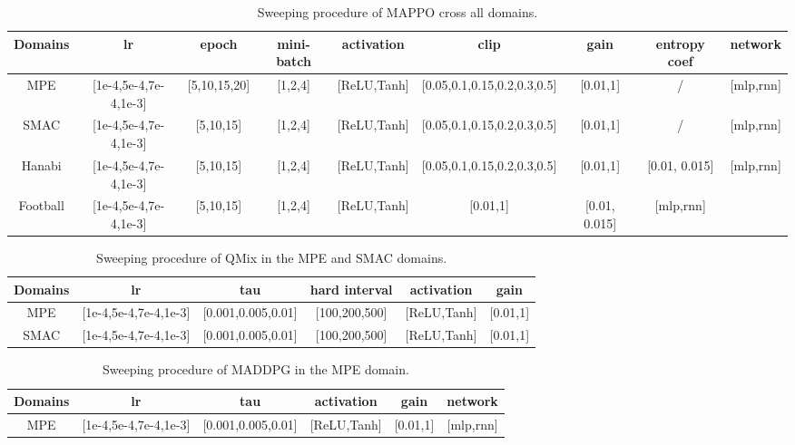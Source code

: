  

\begin{table}[]
\centering
\begin{adjustwidth}{-.98in}{-.5in}
\begin{tabular}{ccccccccc}
\toprule
Domains & lr                        & epoch        & mini-batch & activation      & clip & gain         & entropy coef & network     \\ \midrule
MPE     & {[}1e-4,5e-4,7e-4,1e-3{]} & {[}5,10,15,20{]} & {[}1,2,4{]}       & {[}ReLU,Tanh{]} & {[}0.05,0.1,0.15,0.2,0.3,0.5{]} & {[}0.01,1{]} & /  & {[}mlp,rnn{]}               \\ 
SMAC    & {[}1e-4,5e-4,7e-4,1e-3{]} & {[}5,10,15{]}    & {[}1,2,4{]}       & {[}ReLU,Tanh{]} & {[}0.05,0.1,0.15,0.2,0.3,0.5{]} & {[}0.01,1{]} & /   & {[}mlp,rnn{]}               \\
Hanabi  & {[}1e-4,5e-4,7e-4,1e-3{]} & {[}5,10,15{]}    & {[}1,2,4{]}       & {[}ReLU,Tanh{]} &{[}0.05,0.1,0.15,0.2,0.3,0.5{]}& {[}0.01,1{]} & {[}0.01, 0.015{]} & {[}mlp,rnn{]} \\
Football  & {[}1e-4,5e-4,7e-4,1e-3{]} & {[}5,10,15{]}    & {[}1,2,4{]}       & {[}ReLU,Tanh{]} & {[}0.01,1{]} & {[}0.01, 0.015{]} & {[}mlp,rnn{]} \\
\bottomrule
\end{tabular}
\end{adjustwidth}
\caption{Sweeping procedure of MAPPO cross all domains.}
\label{tab:MAPPO-tune-hyper}
\end{table}


\begin{table}[]
\centering
\begin{tabular}{cccccc}
\toprule
Domains & lr                        & tau                   & hard interval & activation      & gain         \\\midrule
MPE     & {[}1e-4,5e-4,7e-4,1e-3{]} & {[}0.001,0.005,0.01{]} & {[}100,200,500{]} & {[}ReLU,Tanh{]} & {[}0.01,1{]} \\ 
SMAC    & {[}1e-4,5e-4,7e-4,1e-3{]} & {[}0.001,0.005,0.01{]} & {[}100,200,500{]} & {[}ReLU,Tanh{]} & {[}0.01,1{]} \\ \bottomrule
\end{tabular}
\caption{Sweeping procedure of QMix in the MPE and SMAC domains.}
\label{tab:QMix-tune-hyper}
\end{table}

\begin{table}[]
\centering
\begin{tabular}{cccccc}
\toprule
Domains & lr                        & tau                    & activation      & gain  & network       \\\midrule
MPE     & {[}1e-4,5e-4,7e-4,1e-3{]} & {[}0.001,0.005,0.01{]} & {[}ReLU,Tanh{]} & {[}0.01,1{]}  & {[}mlp,rnn{]}\\ \bottomrule
\end{tabular}
\caption{Sweeping procedure of MADDPG in the MPE domain.}
\label{tab:MADDPG-tune-hyper}
\end{table}



